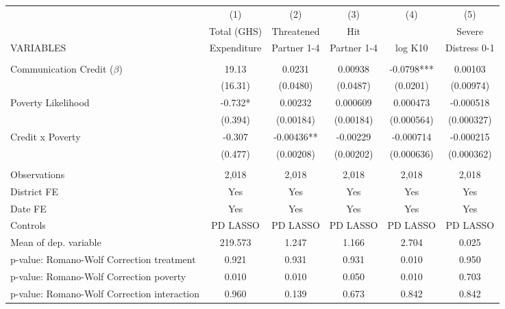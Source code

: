 \begin{tabular}{lccccc} \hline
 & (1) & (2) & (3) & (4) & (5) \\
 & Total (GHS) & Threatened & Hit &  & Severe \\
VARIABLES & Expenditure & Partner 1-4 & Partner 1-4 & log K10 & Distress 0-1 \\ \hline
 &  &  &  &  &  \\
Communication Credit ($\beta$) & 19.13 & 0.0231 & 0.00938 & -0.0798*** & 0.00103 \\
 & (16.31) & (0.0480) & (0.0487) & (0.0201) & (0.00974) \\
Poverty Likelihood & -0.732* & 0.00232 & 0.000609 & 0.000473 & -0.000518 \\
 & (0.394) & (0.00184) & (0.00184) & (0.000564) & (0.000327) \\
Credit x Poverty & -0.307 & -0.00436** & -0.00229 & -0.000714 & -0.000215 \\
 & (0.477) & (0.00208) & (0.00202) & (0.000636) & (0.000362) \\
 &  &  &  &  &  \\
Observations & 2,018 & 2,018 & 2,018 & 2,018 & 2,018 \\
District FE & Yes & Yes & Yes & Yes & Yes \\
Date FE & Yes & Yes & Yes & Yes & Yes \\
Controls & PD LASSO & PD LASSO & PD LASSO & PD LASSO & PD LASSO \\
Mean of dep. variable & 219.573 & 1.247 & 1.166 & 2.704 & 0.025 \\
p-value: Romano-Wolf Correction treatment & 0.921 & 0.931 & 0.931 & 0.010 & 0.950 \\
p-value: Romano-Wolf Correction poverty & 0.010 & 0.010 & 0.050 & 0.010 & 0.703 \\
 p-value: Romano-Wolf Correction interaction & 0.960 & 0.139 & 0.673 & 0.842 & 0.842 \\ \hline
\end{tabular}
